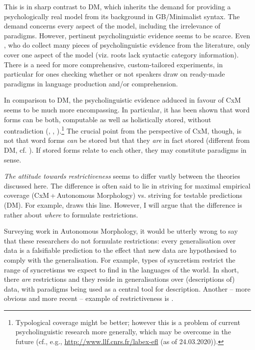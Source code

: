 \documentclass[output=paper]{langsci/langscibook}
\begin{document}
This is in sharp contrast to DM, which inherits the demand for providing a psychologically real model from its background in GB/Minimalist syntax. The demand concerns every aspect of the model, including the irrelevance of paradigms. However, pertinent psycholinguistic evidence seems to be scarce. Even \citet{BarnerBarner2002}, who do collect many pieces of psycholinguistic evidence from the literature, only cover one aspect of the model (viz. roots lack syntactic category information). There is a need for more comprehensive, custom-tailored experiments, in particular for ones checking whether or not speakers draw on ready-made paradigms in language production and/or comprehension.\largerpage

{ In comparison to DM, the psycholinguistic evidence adduced in favour of CxM seems to be much more encompassing. In particular, it has been shown that word forms can be both, computable as well as holistically stored, without contradiction (\citealt{Zwitserlood2018}, \citealt[7–8]{MasiniAudring2019}, \citealt[ch. 7]{JackendoffAudring2020}).\footnote{Typological coverage might be better; however this is a problem of current psycholinguistic research more generally, which may be overcome in the future (cf., e.g., \url{http://www.llf.cnrs.fr/labex-efl} (as of 24.03.2020)).} The crucial point from the perspective of CxM, though, is not that word forms \textit{can} be stored but that they \textit{are} in fact stored (different from DM, cf. \citealt[392, fn. 3]{McGinnis-Archibald2016}). If stored forms relate to each other, they may constitute paradigms in  sense.}

\textit{The attitude towards restrictiveness} seems to differ vastly between the theories discussed here. The difference is often said to lie in striving for maximal empirical coverage (CxM\,+\,Autonomous Morphology) vs. striving for testable predictions (DM). For example, \citet{Kramer2016} draws this line. However, I will argue that the difference is rather about \textit{where} to formulate restrictions.\largerpage

Surveying work in Autonomous Morphology, it would be utterly wrong to say that these researchers do not formulate restrictions: every generalisation over data is a falsifiable prediction to the effect that new data are hypothesised to comply with the generalisation. For example,  types of syncretism restrict the range of syncretisms we expect to find in the languages of the world. In short, there \textit{are} restrictions and they reside in generalisations over (descriptions of) data, with paradigms being used as a central tool for description. Another – more obvious and more recent – example of restrictiveness is \citet{Herce2019}.
\end{document}
